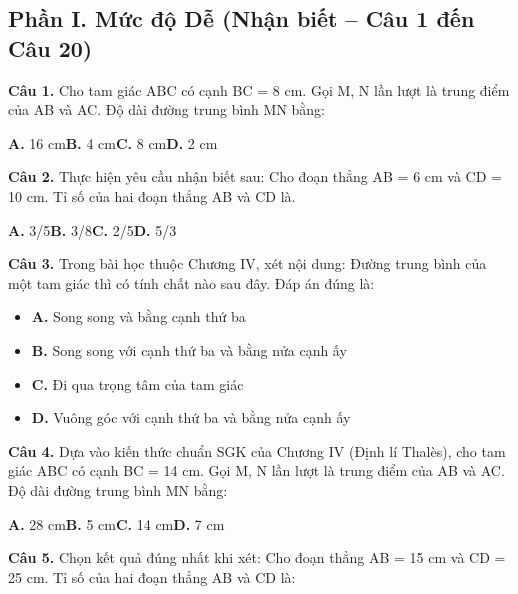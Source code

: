 \documentclass[11pt,a4paper]{article}
\begin{document}
\subsection*{\color{accent} Phần I. Mức độ Dễ (Nhận biết -- Câu 1 đến Câu 20)}
\textbf{\color{primary} Câu 1.} Cho tam giác ABC có cạnh BC = 8 cm. Gọi M, N lần lượt là trung điểm của AB và AC. Độ dài đường trung bình MN bằng:\par
\hspace*{1.5em}\textbf{A.} 16 cm\quad\quad \textbf{B.} 4 cm\quad\quad \textbf{C.} 8 cm\quad\quad \textbf{D.} 2 cm\par\vspace{2pt}
\textbf{\color{primary} Câu 2.} Thực hiện yêu cầu nhận biết sau: Cho đoạn thẳng AB = 6 cm và CD = 10 cm. Tỉ số của hai đoạn thẳng AB và CD là.\par
\hspace*{1.5em}\textbf{A.} 3/5\quad\quad \textbf{B.} 3/8\quad\quad \textbf{C.} 2/5\quad\quad \textbf{D.} 5/3\par\vspace{2pt}
\textbf{\color{primary} Câu 3.} Trong bài học thuộc Chương IV, xét nội dung: Đường trung bình của một tam giác thì có tính chất nào sau đây. Đáp án đúng là:\par
\begin{itemize}\setlength{\itemsep}{1pt}\setlength{\parskip}{0pt}
  \item[] \textbf{A.} Song song và bằng cạnh thứ ba
  \item[] \textbf{B.} Song song với cạnh thứ ba và bằng nửa cạnh ấy
  \item[] \textbf{C.} Đi qua trọng tâm của tam giác
  \item[] \textbf{D.} Vuông góc với cạnh thứ ba và bằng nửa cạnh ấy
\end{itemize}\vspace{2pt}
\textbf{\color{primary} Câu 4.} Dựa vào kiến thức chuẩn SGK của Chương IV (Định lí Thalès), cho tam giác ABC có cạnh BC = 14 cm. Gọi M, N lần lượt là trung điểm của AB và AC. Độ dài đường trung bình MN bằng:\par
\hspace*{1.5em}\textbf{A.} 28 cm\quad\quad \textbf{B.} 5 cm\quad\quad \textbf{C.} 14 cm\quad\quad \textbf{D.} 7 cm\par\vspace{2pt}
\textbf{\color{primary} Câu 5.} Chọn kết quả đúng nhất khi xét: Cho đoạn thẳng AB = 15 cm và CD = 25 cm. Tỉ số của hai đoạn thẳng AB và CD là:\par
\end{document}

